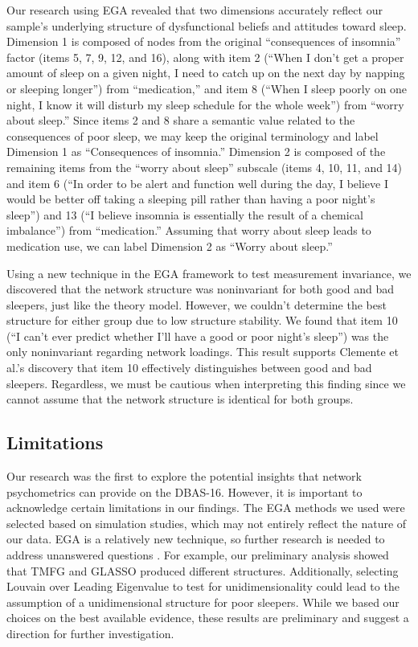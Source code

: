 \documentclass[
  12pt,
  twoside,
  openright,
  a4paper,
  chapter=TITLE,
  section=TITLE,
  brazil]{abntex2}
\begin{document}
Our research using EGA revealed that two dimensions accurately reflect
our sample's underlying structure of dysfunctional beliefs and attitudes
toward sleep. Dimension 1 is composed of nodes from the original
``consequences of insomnia'' factor (items 5, 7, 9, 12, and 16), along
with item 2 (``When I don't get a proper amount of sleep on a given
night, I need to catch up on the next day by napping or sleeping
longer'') from ``medication,'' and item 8 (``When I sleep poorly on one
night, I know it will disturb my sleep schedule for the whole week'')
from ``worry about sleep.'' Since items 2 and 8 share a semantic value
related to the consequences of poor sleep, we may keep the original
terminology and label Dimension 1 as ``Consequences of insomnia.''
Dimension 2 is composed of the remaining items from the ``worry about
sleep'' subscale (items 4, 10, 11, and 14) and item 6 (``In order to be
alert and function well during the day, I believe I would be better off
taking a sleeping pill rather than having a poor night's sleep'') and 13
(``I believe insomnia is essentially the result of a chemical
imbalance'') from ``medication.'' Assuming that worry about sleep leads
to medication use, we can label Dimension 2 as ``Worry about sleep.''

Using a new technique in the EGA framework to test measurement
invariance, we discovered that the network structure was noninvariant
for both good and bad sleepers, just like the theory model. However, we
couldn't determine the best structure for either group due to low
structure stability. We found that item 10 (``I can't ever predict
whether I'll have a good or poor night's sleep'') was the only
noninvariant regarding network loadings. This result supports Clemente
et al.'s \autocite*{clemente2023} discovery that item 10 effectively
distinguishes between good and bad sleepers. Regardless, we must be
cautious when interpreting this finding since we cannot assume that the
network structure is identical for both groups.

\hypertarget{limitations}{%
\subsection{Limitations}\label{limitations}}

Our research was the first to explore the potential insights that
network psychometrics can provide on the DBAS-16. However, it is
important to acknowledge certain limitations in our findings. The EGA
methods we used were selected based on simulation studies, which may not
entirely reflect the nature of our data. EGA is a relatively new
technique, so further research is needed to address unanswered questions
\autocite{golino2022}. For example, our preliminary analysis showed that
TMFG and GLASSO produced different structures. Additionally, selecting
Louvain over Leading Eigenvalue to test for unidimensionality could lead
to the assumption of a unidimensional structure for poor sleepers. While
we based our choices on the best available evidence, these results are
preliminary and suggest a direction for further investigation.
\end{document}
